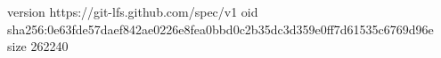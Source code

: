 version https://git-lfs.github.com/spec/v1
oid sha256:0e63fde57daef842ae0226e8fea0bbd0c2b35dc3d359e0ff7d61535c6769d96e
size 262240
